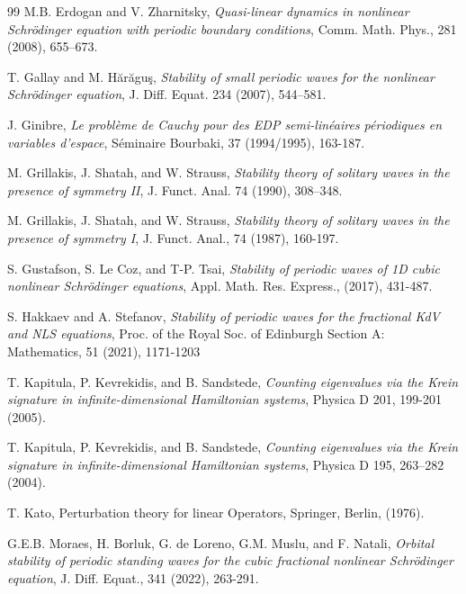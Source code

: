 \documentclass[12pt,reqno,a4paper]{amsart} %
\numberwithin{equation}{section}
\numberwithin{figure}{section}
\begin{document}
\begin{thebibliography}{99}
 M.B. Erdogan and V. Zharnitsky, \textit{Quasi-linear dynamics in nonlinear Schr\"odinger equation with periodic
boundary conditions}, Comm. Math. Phys., 281 (2008), 655–673.


 T. Gallay and M. H\u ar\u agu\c s, \textit{Stability of small periodic waves for the nonlinear Schr\"odinger equation}, J. Diff. Equat. 234 (2007), 544--581.

 J. Ginibre, \textit{Le probl\`eme de Cauchy pour des EDP semi-lin\'eaires p\'eriodiques en variables d’espace}, S\'eminaire Bourbaki, 37 (1994/1995), 163-187.


 M. Grillakis, J. Shatah, and W. Strauss, \textit{ Stability theory of solitary waves in the presence of symmetry II}, J. Funct. Anal. 74 (1990), 308–348.

 M. Grillakis, J. Shatah, and W. Strauss, \textit{ Stability theory of solitary waves in the presence of symmetry I}, J. Funct. Anal., 74 (1987), 160-197.



 S. Gustafson, S. Le Coz, and T-P. Tsai, \textit{Stability of periodic waves of 1D cubic nonlinear
	Schr\"odinger equations}, Appl. Math. Res. Express., (2017), 431-487.
	
	 S. Hakkaev and A. Stefanov, \textit{Stability of periodic waves for the fractional KdV and NLS equations}, Proc. of the Royal Soc. of Edinburgh Section A: Mathematics, 51 (2021), 1171-1203



 T. Kapitula, P. Kevrekidis, and B. Sandstede, \textit{Counting eigenvalues via the Krein signature in infinite-dimensional Hamiltonian systems}, Physica D 201, 199-201 (2005).

 T. Kapitula, P. Kevrekidis, and B. Sandstede, \textit{Counting eigenvalues via the Krein signature in infinite-dimensional Hamiltonian systems}, Physica D 195, 263–282 (2004).



 T. Kato, Perturbation theory for linear Operators,
Springer, Berlin, (1976).

 G.E.B. Moraes, H. Borluk, G. de Loreno, G.M. Muslu, and F. Natali, \textit{Orbital stability of periodic standing waves for the cubic fractional nonlinear Schr\"odinger equation}, J. Diff. Equat., 341 (2022), 263-291.


\end{thebibliography}
\end{document}
